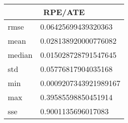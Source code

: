 \begin{table}[!ht] 
 \centering 
 \begin{tabular}{|l|l|} \hline 
 \multicolumn{2}{|c|}{RPE/ATE} \\ \hline 
 rmse & 0.06425699439320363 \\ \hline 
mean & 0.028138920000776082 \\ \hline 
median & 0.015028728791547645 \\ \hline 
std & 0.05776817904035168 \\ \hline 
min & 0.0009207343921989167 \\ \hline 
max & 0.39585598850451914 \\ \hline 
sse & 0.9001135696017083 \\ \hline 
\end{tabular} 
 \end{table}